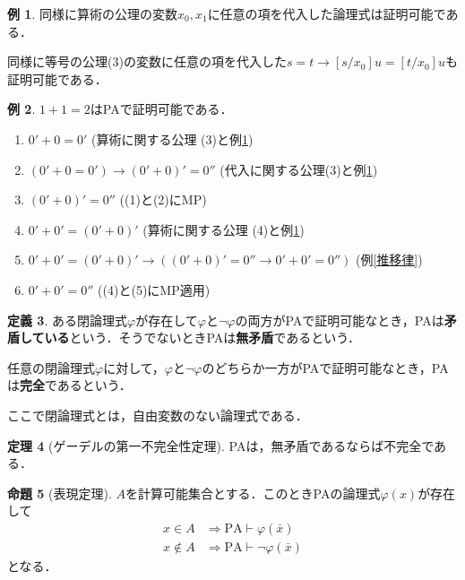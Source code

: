 \documentclass[uplatex]{jsarticle}
\theoremstyle{definition} %
\newtheorem{thm}{定理}
\newtheorem{defi}[thm]{定義}
\newtheorem{prop}[thm]{命題}
\newtheorem{exm}[thm]{例}
\begin{document}
\begin{exm}\label{代入例}
同様に算術の公理の変数$x_0, x_1$に任意の項を代入した論理式は証明可能である．

同様に等号の公理(3)の変数に任意の項を代入した$s = t \to [s/x_0]u = [t/x_0]u$も証明可能である．
\end{exm}

\begin{exm}
$1 + 1 = 2$はPAで証明可能である．

\begin{enumerate}
\item $0' + 0 = 0'$ (算術に関する公理 (3)と例\ref{代入例})
\item $(0' + 0 = 0') \to (0' + 0)' = 0''$ (代入に関する公理(3)と例\ref{代入例})
\item $(0' + 0)' = 0''$ ((1)と(2)にMP)
\item $0' + 0' = (0' + 0)'$ (算術に関する公理 (4)と例\ref{代入例})
\item $0' + 0' = (0' + 0)' \to ((0' + 0)' = 0'' \to 0' + 0' = 0'')$ (例\ref{推移律})
\item $0' + 0' = 0''$ ((4)と(5)にMP適用)
\end{enumerate}
\end{exm}

\begin{defi}
ある閉論理式$\varphi$が存在して$\varphi$と$\neg \varphi$の両方がPAで証明可能なとき，PAは{\bfseries 矛盾している}という．そうでないときPAは{\bfseries 無矛盾}であるという．

任意の閉論理式$\varphi$に対して，$\varphi$と$\neg \varphi$のどちらか一方がPAで証明可能なとき，PAは{\bfseries 完全}であるという．

ここで閉論理式とは，自由変数のない論理式である．
\end{defi}

\begin{thm}[ゲーデルの第一不完全性定理]
PAは，無矛盾であるならば不完全である．
\end{thm}

\begin{prop}[表現定理]
$A$を計算可能集合とする．このときPAの論理式$\varphi(x)$が存在して
\begin{align*}
x \in A &\Rightarrow \mathrm{PA} \vdash \varphi(\bar{x}) \\
x \not \in A &\Rightarrow \mathrm{PA} \vdash \neg \varphi(\bar{x})
\end{align*}
となる．
\end{prop}
\end{document}
